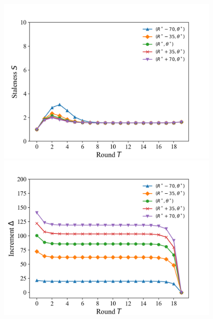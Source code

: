 \documentclass{article}
\theoremstyle{plain}
\theoremstyle{definition}
\theoremstyle{remark}
\begin{document}
\begin{figure}
\begin{minipage}{0.32\linewidth}
		\vspace{3pt}
		\centerline{\includegraphics[width=\textwidth]{figures/figure_55_C.png}}
	\end{minipage}
  \qquad
	\begin{minipage}{0.32\linewidth}
		\vspace{3pt}
		\centerline{\includegraphics[width=\textwidth]{figures/figure_59_A.png}}
	\end{minipage}
	\begin{minipage}{0.32\linewidth}
		\vspace{3pt}

\end{minipage}
\end{figure}
\end{document}
